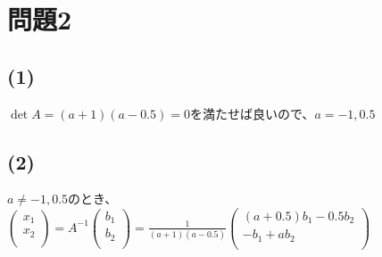 \documentclass[]{jsarticle}
\begin{document}
\section*{問題2}
    \subsection*{(1)}
        $\det A = (a + 1)(a - 0.5) = 0$を満たせば良いので、$a = -1, 0.5$
    \subsection*{(2)}
        $a \neq -1, 0.5$のとき、$
            \displaystyle\begin{pmatrix}
                x_1 \\
                x_2 \\
            \end{pmatrix} =
            A^{-1}\begin{pmatrix}
                b_1 \\
                b_2 \\
            \end{pmatrix} =
            \frac{1}{(a + 1)(a - 0.5)}\begin{pmatrix}
                (a + 0.5)b_1 - 0.5b_2 \\
                -b_1 + ab_2 \\
            \end{pmatrix}
        $
\end{document}
